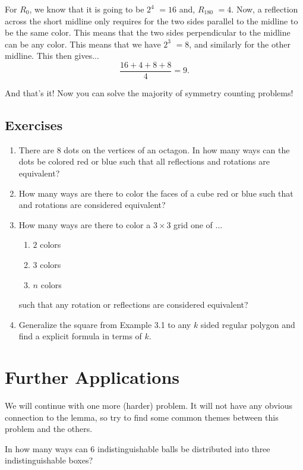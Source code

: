\documentclass[11pt]{scrartcl}
\begin{document}
For $R_0$, we know that it is going to be $2^4$ \boldmath $= 16$ \unboldmath and, $R_{180}$ \boldmath $= 4$\unboldmath. Now, a reflection across the short midline only requires for the two sides parallel to the midline to be the same color. This means that the two sides perpendicular to the midline can be any color. This means that we have $2^3$ \boldmath $= 8$\unboldmath, and similarly for the other midline. This then gives...$$\dfrac{16+4+8+8}{4} = \boxed{9}.$$

And that's it! Now you can solve the majority of symmetry counting problems!

\subsection{Exercises}
\begin{enumerate}
    \item There are $8$ dots on the vertices of an octagon. In how many ways can the dots be colored red or blue such that all reflections and rotations are equivalent?
    \item How many ways are there to color the faces of a cube red or blue such that and rotations are considered equivalent?
    \item How many ways are there to color a $3 \times 3$ grid one of ...
    \begin{enumerate}
        \item $2$ colors
        \item $3$ colors
        \item $n$ colors
    \end{enumerate}
    such that any rotation or reflections are considered equivalent?
    \item[4\textbf{H}.] Generalize the square from Example 3.1 to any $k$ sided regular polygon and find a explicit formula in terms of $k$.
\end{enumerate}

\newpage

\section{Further Applications}

We will continue with one more (harder) problem. It will not have any obvious connection to the lemma, so try to find some common themes between this problem and the others.

\begin{example*}  
  In how many ways can $6$ indistinguishable balls be distributed into three indistinguishable boxes?
\end{example*}
\end{document}
